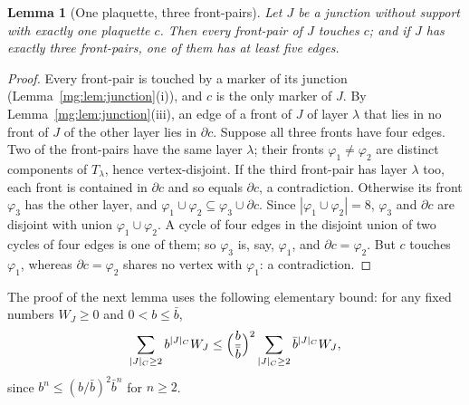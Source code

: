 \documentclass[11pt,a4paper]{article}
\newtheorem{lemma}[theorem]{Lemma}
\theoremstyle{definition}
\theoremstyle{remark}
\begin{document}
\begin{lemma}[One plaquette, three front-pairs]\label{mg:lem:oneplaq}
Let $J$ be a junction without support with exactly one plaquette $c$. Then every front-pair of $J$ touches $c$; and if $J$ has exactly three
front-pairs, one of them has at least five edges.
\end{lemma}

\begin{proof}
Every front-pair is touched by a marker of its junction (Lemma~\ref{mg:lem:junction}(i)), and $c$ is the only marker of $J$. By
Lemma~\ref{mg:lem:junction}(iii), an edge of a front of $J$ of layer $\lambda$ that lies in no front of $J$ of the other layer lies in $\partial c$. Suppose all
three fronts have four edges. Two of the front-pairs have the same layer $\lambda$; their fronts $\varphi_1\ne\varphi_2$ are distinct components of $T_\lambda$, hence
vertex-disjoint. If the third front-pair has layer $\lambda$ too, each front is contained in $\partial c$ and so equals $\partial c$, a contradiction. Otherwise
its front $\varphi_3$ has the other layer, and $\varphi_1\cup\varphi_2\subseteq\varphi_3\cup\partial c$. Since $|\varphi_1\cup\varphi_2|=8$, $\varphi_3$ and $\partial c$ are disjoint with
union $\varphi_1\cup\varphi_2$. A cycle of four edges in the disjoint union of two cycles of four edges is one of them; so $\varphi_3$ is, say, $\varphi_1$, and
$\partial c=\varphi_2$. But $c$ touches $\varphi_1$, whereas $\partial c=\varphi_2$ shares no vertex with $\varphi_1$: a contradiction.
\end{proof}

The proof of the next lemma uses the following elementary bound: for any fixed numbers $W_J\ge0$ and $0<b\le\bar b$,
\[
\sum_{|J|_C\ge2}b^{|J|_C}W_J\le\Bigl(\frac b{\bar b}\Bigr)^2\sum_{|J|_C\ge2}\bar b^{|J|_C}W_J ,
\]
since $b^n\le(b/\bar b)^2\bar b^n$ for $n\ge2$.
\end{document}

